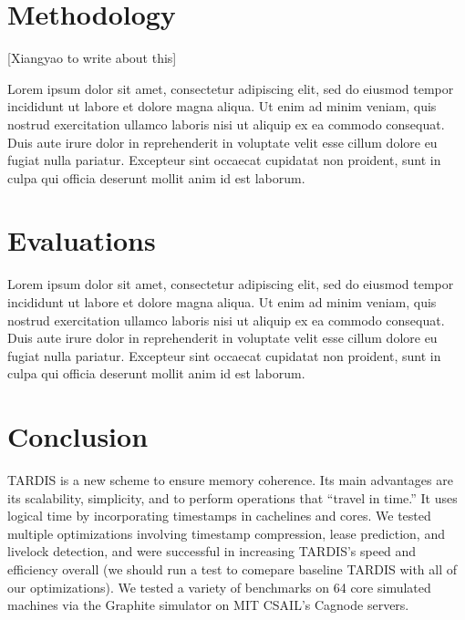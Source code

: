 \documentclass[12pt]{article}
\begin{document}
\section{Methodology}

[Xiangyao to write about this]

Lorem ipsum dolor sit amet, consectetur adipiscing elit, sed do eiusmod tempor incididunt ut labore et dolore magna aliqua. Ut enim ad minim veniam, quis nostrud exercitation ullamco laboris nisi ut aliquip ex ea commodo consequat. Duis aute irure dolor in reprehenderit in voluptate velit esse cillum dolore eu fugiat nulla pariatur. Excepteur sint occaecat cupidatat non proident, sunt in culpa qui officia deserunt mollit anim id est laborum.

\section{Evaluations}

Lorem ipsum dolor sit amet, consectetur adipiscing elit, sed do eiusmod tempor incididunt ut labore et dolore magna aliqua. Ut enim ad minim veniam, quis nostrud exercitation ullamco laboris nisi ut aliquip ex ea commodo consequat. Duis aute irure dolor in reprehenderit in voluptate velit esse cillum dolore eu fugiat nulla pariatur. Excepteur sint occaecat cupidatat non proident, sunt in culpa qui officia deserunt mollit anim id est laborum.

\section{Conclusion}
	TARDIS is a new scheme to ensure memory coherence. Its main advantages are its scalability, simplicity, and to perform operations that “travel in time.” It uses logical time by incorporating timestamps in cachelines and cores. We tested multiple optimizations involving timestamp compression, lease prediction, and livelock detection, and were successful in increasing TARDIS’s speed and efficiency overall (we should run a test to comepare baseline TARDIS with all of our optimizations). We tested a variety of benchmarks on 64 core simulated machines via the Graphite simulator on MIT CSAIL’s Cagnode servers.
\end{document}

